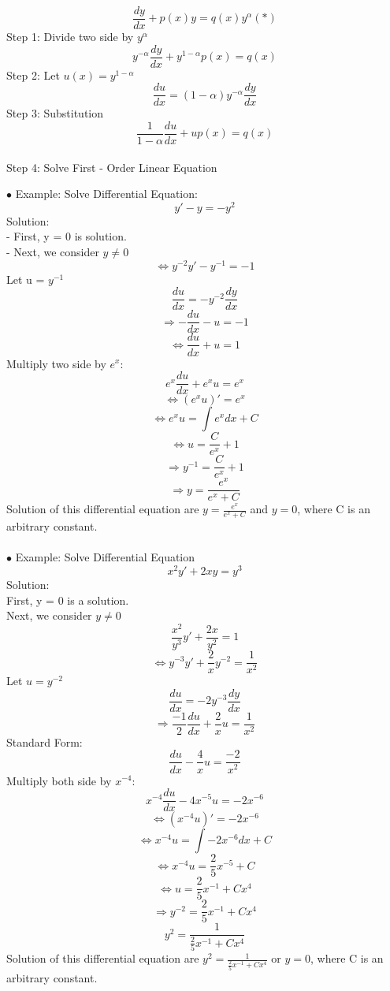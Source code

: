 \documentclass[12pt]{article}
\begin{document}
\begin{mybox}
     $$\frac{dy}{dx} +p(x)y = q(x)y^\alpha (*)$$ 
     Step 1: Divide two side by $y^\alpha$
     $$y^{-\alpha}\frac{dy}{dx} + y^{1-\alpha}p(x) = q(x)$$
     Step 2: Let $u(x) = y^{1-\alpha}$ 
     $$\frac{du}{dx} =(1-\alpha) y^{-\alpha}\frac{dy}{dx}$$
     Step 3: Substitution 
     $$\frac{1}{1-\alpha} \frac{du}{dx} + up(x) =q(x)$$
     \\
     Step 4: Solve First - Order Linear Equation

    
\end{mybox}
$\bullet$ Example: Solve Differential Equation: \\
$$y' -y = -y^2$$
Solution: 
\\
- First, y = 0 is solution. \\
- Next, we consider $y \neq 0$\\
$$\Leftrightarrow y^{-2}y' - y^{-1} = -1$$
Let u = $y^{-1}$
$$\frac{du}{dx} = -y^{-2}\frac{dy}{dx}$$
$$\Rightarrow -\frac{du}{dx} -u = -1$$
$$\Leftrightarrow \frac{du}{dx} + u =1$$
Multiply two side by $e^x$: 
\\
$$e^x\frac{du}{dx} + e^xu = e^x$$
$$\Leftrightarrow (e^xu)' = e^x$$
$$\Leftrightarrow e^xu = \int e^xdx + C$$
$$\Leftrightarrow u = \frac{C}{e^x} + 1$$
$$\Rightarrow y^{-1} = \frac{C}{e^x} + 1$$
$$\Rightarrow y = \frac{e^x}{e^x + C}$$
Solution of this differential equation are $y = \frac{e^x}{e^x + C}$ and $y = 0$,
where C is an arbitrary constant. \\
\\
$\bullet$ Example: Solve Differential Equation \\
$$x^2y'+2xy = y^3$$
Solution: \\
First, y = 0 is a solution. \\
Next, we consider $y \neq 0$
$$\frac{x^2}{y^3}y' + \frac{2x}{y^2} = 1$$
$$\Leftrightarrow y^{-3}y'+ \frac{2}{x}y^{-2} = \frac{1}{x^2}$$
Let $u = y^{-2}$
$$\frac{du}{dx} = -2y^{-3}\frac{dy}{dx}$$
$$\Rightarrow \frac{-1}{2}\frac{du}{dx} + \frac{2}{x}u = \frac{1}{x^2}$$
Standard Form: \\
$$\frac{du}{dx} - \frac{4}{x} u = \frac{-2}{x^2}$$
Multiply both side by $x^{-4}$: 
$$ x^{-4} \frac{du}{dx} -4x^{-5}u = -2x^{-6}$$
$$\Leftrightarrow (x^{-4}u)' = -2x^{-6}$$
$$\Leftrightarrow x^{-4}u = \int -2x^{-6}dx + C$$
$$ \Leftrightarrow x^{-4}u = \frac{2
}{5}x^{-5} + C$$
$$\Leftrightarrow u = \frac{2}{5} x^{-1} + Cx^{4}$$
$$\Rightarrow y^{-2} =\frac{2}{5} x^{-1} + Cx^{4}$$
$$y^2 = \frac{1}{\frac{2}{5} x^{-1} + Cx^{4}}$$
Solution of this differential equation are $y^2 = \frac{1}{\frac{2}{5} x^{-1} + Cx^{4}}$ or $y =0$, where C is an arbitrary constant. 
\\
\end{document}
